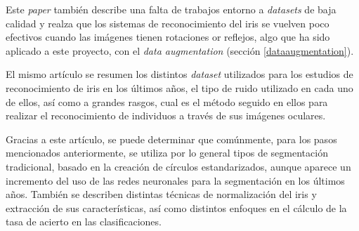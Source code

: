  Este \textit{paper} también describe una falta de trabajos entorno a \textit{datasets} de baja calidad y realza que los sistemas de reconocimiento del iris se vuelven 
 poco efectivos cuando las imágenes tienen rotaciones or reflejos, algo que ha sido aplicado a este proyecto, con el \textit{data augmentation} (sección \ref{dataaugmentation}).

 El mismo artículo se resumen los distintos \textit{dataset} utilizados para los estudios de reconocimiento de iris en los últimos años, el tipo de ruido utilizado en cada uno de ellos,
 así como a grandes rasgos, cual es el método seguido en ellos para realizar el reconocimiento de individuos a través de sus imágenes oculares.
 
 Gracias a este artículo, se puede determinar que comúnmente, para los pasos mencionados anteriormente, se utiliza por lo general tipos de segmentación tradicional, basado en la creación de círculos estandarizados, aunque aparece un incremento del uso de las redes neuronales para la segmentación en los últimos años.
 También se describen distintas técnicas de normalización del iris y extracción de sus características, así como distintos enfoques en el cálculo de la tasa de acierto en las clasificaciones.





